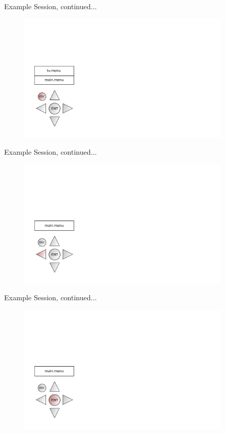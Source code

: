 \documentclass[style=smrt,mode=present,paper=screen]{powerdot}
\begin{document}
\begin{slide}[toc=,bm=]{Example Session, continued...}
\begin{figure}[htb]
	\includegraphics[width=4in]{figures/example-session-04}
\end{figure}
\end{slide}

\begin{slide}[toc=,bm=]{Example Session, continued...}
\begin{figure}[htb]
	\includegraphics[width=4in]{figures/example-session-05}
\end{figure}
\end{slide}

\begin{slide}[toc=,bm=]{Example Session, continued...}
\begin{figure}[htb]
	\includegraphics[width=4in]{figures/example-session-06}
\end{figure}
\end{slide}
\end{document}
